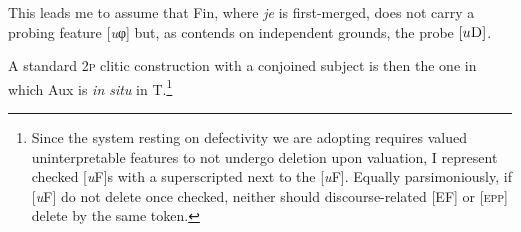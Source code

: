 \documentclass[output=paper]{langsci/langscibook}
\begin{document}
This leads me to assume that Fin, where \emph{je} is first-merged, does not
carry a probing feature [\emph{u}φ] but, as \citet{Roberts2010,roberts:2012uq}
contends on independent grounds, the probe $[u\textsc{D}]$.

A standard \textsc{2p} clitic construction with a conjoined subject is then the
one in which Aux is \emph{in situ} in T.\footnote{Since the system
    resting on defectivity we are adopting requires valued uninterpretable
    features to not undergo deletion upon valuation, I represent checked
    [\emph{u}F]s with a superscripted  next to the [\emph{u}F].
    Equally parsimoniously, if [\emph{u}F] do not delete once checked, neither
should discourse-related [\gls{EF}] or \textsc{[epp]} delete by the same
token.}

\begin{exe}
	\ex
	\label{tree1}
\end{exe}
\end{document}
